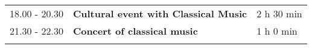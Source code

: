 \begin{longtable}{p{3cm}p{10cm}p{4cm}}
\vspace{1cm}
18.00 - 20.30 & {\bf Cultural event with Classical Music} & \hfill 2 h 30 min\\ 
\vspace{1cm}
21.30 - 22.30 & {\bf Concert of classical music} & \hfill 1 h 0 min\\ 
\vspace{1cm}
\end{longtable}

